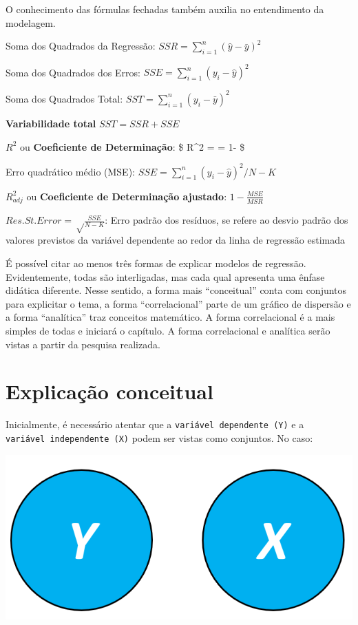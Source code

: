 \documentclass[
]{book}
\begin{document}
O conhecimento das fórmulas fechadas também auxilia no entendimento da modelagem.

\begin{writing}
Soma dos Quadrados da Regressão:
\(SSR = \sum_{i=1}^{n}(\hat{y} - \bar{y})^2\)

Soma dos Quadrados dos Erros: \(SSE = \sum_{i=1}^{n}(y_i - \hat{y})^2\)

Soma dos Quadrados Total: \(SST = \sum_{i=1}^{n}(y_i - \bar{y})^2\)

\textbf{Variabilidade total} \(SST = SSR + SSE\)

\(R^2\) ou \textbf{Coeficiente de Determinação}: \$ R\^{}2 =
 = 1- \$

Erro quadrático médio (MSE):
\(SSE = \sum_{i=1}^{n}(y_i - \hat{y})^2 /N-K\)

\(R^2_{adj}\) ou \textbf{Coeficiente de Determinação ajustado}:
\(1-\frac{MSE}{MSR}\)

\(Res. St. Error = \sqrt\frac{SSE}{N-K}\): Erro padrão dos resíduos, se
refere ao desvio padrão dos valores previstos da variável dependente ao
redor da linha de regressão estimada
\end{writing}

É possível citar ao menos três formas de explicar modelos de regressão. Evidentemente, todas são interligadas, mas cada qual apresenta uma ênfase didática diferente. Nesse sentido, a forma mais ``conceitual'' conta com conjuntos para explicitar o tema, a forma ``correlacional'' parte de um gráfico de dispersão e a forma ``analítica'' traz conceitos matemático. A forma correlacional é a mais simples de todas e iniciará o capítulo. A forma correlacional e analítica serão vistas a partir da pesquisa realizada.

\hypertarget{explicauxe7uxe3o-conceitual}{%
\section{Explicação conceitual}\label{explicauxe7uxe3o-conceitual}}

Inicialmente, é necessário atentar que a \texttt{variável\ dependente\ (Y)} e a \texttt{variável\ independente\ (X)} podem ser vistas como conjuntos. No caso:

\includegraphics{./img/cap_reg_x_y.png}
\end{document}
